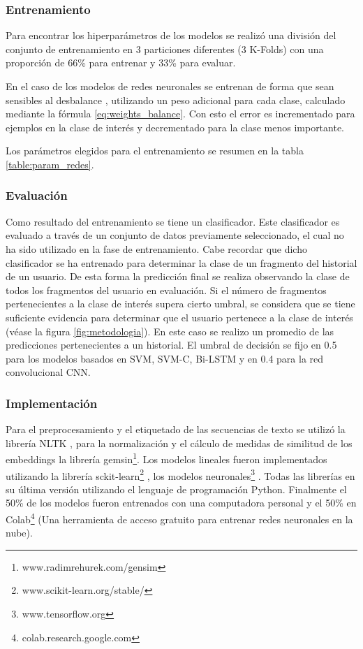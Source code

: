 

\subsubsection{Entrenamiento}
Para encontrar los hiperparámetros de los modelos se realizó una división del conjunto de entrenamiento en 3 particiones diferentes (3 K-Folds) con una proporción de 66\% para entrenar y 33\% para evaluar.

En el caso de los modelos de redes neuronales se entrenan de forma que sean sensibles al desbalance \citep{wang2016training}, utilizando un peso adicional para cada clase, calculado mediante la fórmula \ref{eq:weights_balance}. Con esto el error es incrementado para ejemplos en la clase de interés y decrementado para la clase menos importante.

Los parámetros elegidos para el entrenamiento se resumen en la tabla \ref{table:param_redes}. 

\subsubsection{Evaluación}

Como resultado del entrenamiento se tiene un clasificador. Este clasificador es evaluado a través de un conjunto de datos previamente seleccionado, el cual no ha sido utilizado en la fase de entrenamiento. Cabe recordar que dicho clasificador se ha entrenado para determinar la clase de un fragmento del historial de un usuario. De esta forma la predicción final se realiza observando la clase de todos los fragmentos del usuario en evaluación. Si el número de fragmentos pertenecientes a la clase de interés supera cierto umbral, se considera que se tiene suficiente evidencia para determinar que el usuario pertenece a la clase de interés (véase la figura \ref{fig:metodologia}). En este caso se realizo un promedio de las predicciones pertenecientes a un historial. El umbral de decisión se fijo en 0.5 para los modelos basados en SVM, SVM-C, Bi-LSTM y en 0.4 para la red convolucional CNN.



\subsubsection{Implementación}
Para el preprocesamiento y el etiquetado de las secuencias de texto se utilizó la librería NLTK \citep{loper2002nltk}, para la normalización y el cálculo de medidas de similitud de los embeddings la librería gemsin\footnote{www.radimrehurek.com/gensim}.
Los modelos lineales fueron implementados utilizando la librería sckit-learn\footnote{www.scikit-learn.org/stable/} \citep{scikitlearn}, los modelos neuronales\footnote{www.tensorflow.org} \citep{tensorflow2015whitepaper}. Todas las librerías en su última versión utilizando el lenguaje de programación Python. Finalmente el 50\% de los modelos fueron entrenados con una computadora personal y el 50\% en Colab\footnote{colab.research.google.com} (Una herramienta de acceso gratuito para entrenar redes neuronales en la nube).
